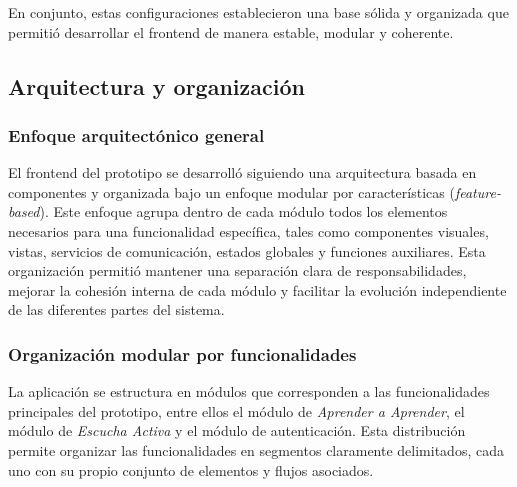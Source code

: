 En conjunto, estas configuraciones establecieron una base sólida y organizada que permitió desarrollar el frontend de manera estable, modular y coherente.

\subsection{Arquitectura y organización}

\subsubsection{Enfoque arquitectónico general}
El frontend del prototipo se desarrolló siguiendo una arquitectura basada en componentes y organizada bajo un enfoque modular por características (\textit{feature-based}). Este enfoque agrupa dentro de cada módulo todos los elementos necesarios para una funcionalidad específica, tales como componentes visuales, vistas, servicios de comunicación, estados globales y funciones auxiliares. Esta organización permitió mantener una separación clara de responsabilidades, mejorar la cohesión interna de cada módulo y facilitar la evolución independiente de las diferentes partes del sistema.

\subsubsection{Organización modular por funcionalidades}
La aplicación se estructura en módulos que corresponden a las funcionalidades principales del prototipo, entre ellos el módulo de \textit{Aprender a Aprender}, el módulo de \textit{Escucha Activa} y el módulo de autenticación. Esta distribución permite organizar las funcionalidades en segmentos claramente delimitados, cada uno con su propio conjunto de elementos y flujos asociados.

